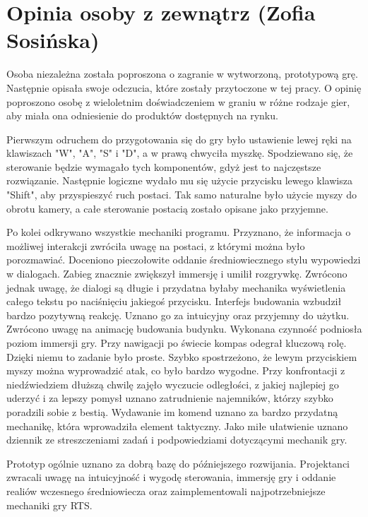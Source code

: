 \section{Opinia osoby z zewnątrz (Zofia Sosińska)}
Osoba niezależna została poproszona o zagranie w wytworzoną, prototypową grę. Następnie opisała swoje odczucia, które zostały przytoczone 
w tej pracy. O opinię poproszono osobę z wieloletnim doświadczeniem w graniu w różne rodzaje gier, aby miała ona odniesienie do produktów
dostępnych na rynku.

Pierwszym odruchem do przygotowania się do gry było ustawienie lewej ręki na klawiszach "W", "A", "S" i "D", a w prawą chwyciła myszkę. Spodziewano się, 
że sterowanie będzie wymagało tych komponentów, gdyż jest to najczęstsze rozwiązanie. Następnie logiczne wydało mu się użycie przycisku lewego klawisza "Shift", aby przyspieszyć ruch postaci. 
Tak samo naturalne było użycie myszy do obrotu kamery, a całe sterowanie postacią zostało opisane jako przyjemne.

Po kolei odkrywano wszystkie mechaniki programu. Przyznano, że informacja o możliwej interakcji zwróciła uwagę na postaci, z którymi można było porozmawiać. 
Doceniono pieczołowite oddanie średniowiecznego stylu wypowiedzi w dialogach. Zabieg znacznie zwiększył immersję i umilił rozgrywkę. Zwrócono jednak uwagę,
że dialogi są długie i przydatna byłaby mechanika wyświetlenia całego tekstu po naciśnięciu jakiegoś przycisku. Interfejs budowania wzbudził bardzo pozytywną reakcję.
Uznano go za intuicyjny oraz przyjemny do użytku. Zwrócono uwagę na animację budowania budynku. Wykonana czynność podniosła poziom immersji gry. Przy nawigacji po świecie
kompas odegrał kluczową rolę. Dzięki niemu to zadanie było proste. Szybko spostrzeżono, że lewym przyciskiem myszy można wyprowadzić atak, co było bardzo wygodne. 
Przy konfrontacji z niedźwiedziem dłuższą chwilę zajęło wyczucie odległości, z jakiej najlepiej go uderzyć i za lepszy pomysł uznano zatrudnienie najemników, którzy szybko poradzili
sobie z bestią. Wydawanie im komend uznano za bardzo przydatną mechanikę, która wprowadziła element taktyczny. Jako miłe ułatwienie uznano dziennik ze streszczeniami zadań i 
podpowiedziami dotyczącymi mechanik gry.

Prototyp ogólnie uznano za dobrą bazę do późniejszego rozwijania. Projektanci zwracali uwagę na intuicyjność i wygodę sterowania, immersję gry i oddanie realiów wczesnego średniowiecza
oraz zaimplementowali najpotrzebniejsze mechaniki gry RTS. 